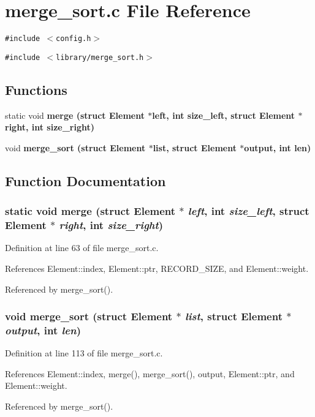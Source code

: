 \section{merge\_\-sort.c File Reference}
\label{merge__sort_8c}
{\tt \#include $<$config.h$>$}\par
{\tt \#include $<$library/merge\_\-sort.h$>$}\par
\subsection*{Functions}
\begin{CompactItemize}
\item 
static void \bf{merge} (struct \bf{Element} $\ast$left, int size\_\-left, struct \bf{Element} $\ast$right, int size\_\-right)
\item 
void \bf{merge\_\-sort} (struct \bf{Element} $\ast$\bf{list}, struct \bf{Element} $\ast$output, int len)
\end{CompactItemize}


\subsection{Function Documentation}
\subsubsection{\setlength{\rightskip}{0pt plus 5cm}static void merge (struct \bf{Element} $\ast$ {\em left}, int {\em size\_\-left}, struct \bf{Element} $\ast$ {\em right}, int {\em size\_\-right})\hspace{0.3cm}{\tt  [static]}}\label{merge__sort_8c_db9c8473df02ee8a26b62f9799ef9761}




Definition at line 63 of file merge\_\-sort.c.

References Element::index, Element::ptr, RECORD\_\-SIZE, and Element::weight.

Referenced by merge\_\-sort().
\subsubsection{\setlength{\rightskip}{0pt plus 5cm}void merge\_\-sort (struct \bf{Element} $\ast$ {\em list}, struct \bf{Element} $\ast$ {\em output}, int {\em len})}\label{merge__sort_8c_0ac3ede4817614f686f82d83538cd730}




Definition at line 113 of file merge\_\-sort.c.

References Element::index, merge(), merge\_\-sort(), output, Element::ptr, and Element::weight.

Referenced by merge\_\-sort().